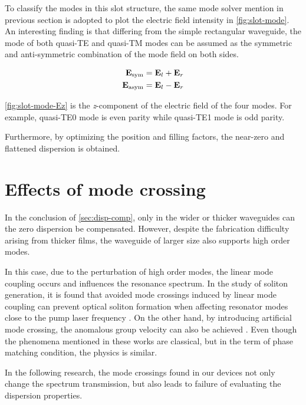 To classify the modes in this slot structure, the same mode solver mention in previous section is adopted to plot the electric field intensity in \autoref{fig:slot-mode}. 
An interesting finding is that differing from the simple rectangular waveguide, 
the mode of both quasi-TE and quasi-TM modes can be assumed as the symmetric and anti-symmetric combination of the mode field on both sides. 

\begin{align}\label{key}
	\vb{E}_\mathrm{sym} &= \vb{E}_{l} + \vb{E}_{r} \\
	\vb{E}_\mathrm{asym} &= \vb{E}_{l} - \vb{E}_{r} \nonumber
\end{align}

\autoref{fig:slot-mode-Ez} is the \textit{z}-component of the electric field of the four modes. For example, quasi-TE0 mode is even parity while quasi-TE1 mode is odd parity.

Furthermore, by optimizing the position and filling factors, the near-zero and flattened dispersion is obtained. 

\section{Effects of mode crossing}

In the conclusion of \autoref{sec:disp-comp},
only in the wider or thicker waveguides can the zero dispersion be compensated. However, 
despite the fabrication difficulty arising from thicker films,
the waveguide of larger size also supports high order modes. 

In this case, due to the perturbation of high order modes, the linear mode coupling occurs and influences the resonance spectrum. 
In the study of soliton generation,
it is found that avoided mode crossings induced by linear mode coupling can prevent optical soliton formation when affecting resonator modes close to the pump laser frequency \cites{Herr2014a,Bao2018}. On the other hand, by introducing artificial mode crossing, the anomalous group velocity can also be achieved \cite{Kim2017}. Even though the phenomena mentioned in these works are classical, but in the term of phase matching condition, the physics is similar.

In the following research, the mode crossings found in our devices not only change the spectrum transmission, but also leads to failure of evaluating the dispersion properties.



